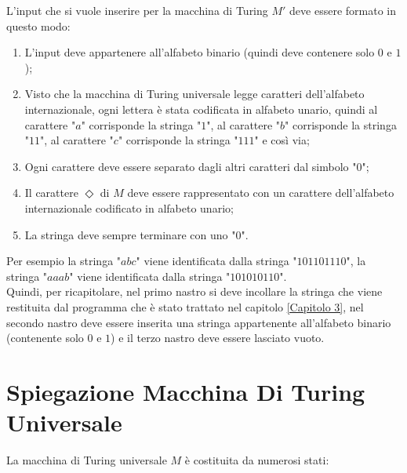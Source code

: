 \documentclass[a4paper,12pt,titlepage,oneside]{book}
\begin{document}
L'input che si vuole inserire per la macchina di Turing $M'$ deve essere formato in questo modo:

\begin{enumerate}
	\item L'input deve appartenere all'alfabeto binario (quindi deve contenere solo $0$ e $1$);
	\item Visto che la macchina di Turing universale legge caratteri dell'alfabeto internazionale, ogni lettera è stata codificata in alfabeto unario, quindi al carattere "$a$" corrisponde la stringa "$1$", al carattere "$b$" corrisponde la stringa "$11$", al carattere "$c$" corrisponde la stringa "$111$" e così via;
	\item Ogni carattere deve essere separato dagli altri caratteri dal simbolo "$0$";
	\item Il carattere $\Diamond$ di $M$ deve essere rappresentato con un carattere dell'alfabeto internazionale codificato in alfabeto unario;
	\item La stringa deve sempre terminare con uno "$0$".
\end{enumerate}

Per esempio la stringa "$abc$" viene identificata dalla stringa "$101101110$", la stringa "$aaab$" viene identificata dalla stringa "$101010110$".\\
Quindi, per ricapitolare, nel primo nastro si deve incollare la stringa che viene restituita dal programma che è stato trattato nel capitolo \ref{Capitolo 3}, nel secondo nastro deve essere inserita  una stringa appartenente all'alfabeto binario (contenente solo $0$ e $1$) e il terzo nastro deve essere lasciato vuoto.

		\section{Spiegazione Macchina Di Turing Universale}
		
La macchina di Turing universale $M$ è costituita da numerosi stati:
\end{document}
